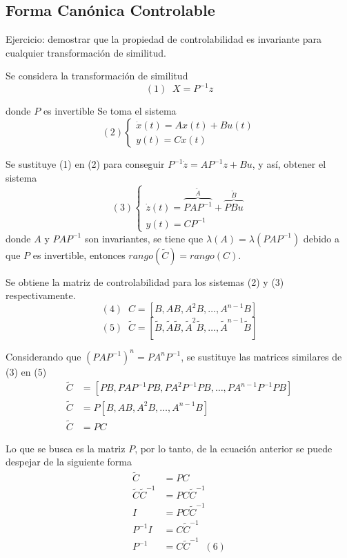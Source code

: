 \subsection{Forma Canónica Controlable}

Ejercicio: demostrar que la propiedad de controlabilidad es invariante para cualquier transformación de similitud.

Se considera la transformación de similitud
\[
    (1) \;\; X = P^{-1}z
\]

donde \( P \) es invertible
Se toma el sistema 
\[(2)
    \left\{
        \begin{array}{lll}
            \dot{x}(t) = Ax(t) + Bu(t) \\
            y(t) = Cx(t)
        \end{array}
    \right.
\]

Se sustituye (1) en (2) para conseguir \( P^{-1}\dot{z} = AP^{-1}z+Bu \), y así, obtener el sistema
\[(3)
    \left\{
        \begin{array}{lll}
            \dot{z}(t) = \overbrace{ PAP^{-1}}^{\tilde{A} } + \overbrace{ PBu}^{\tilde{B} } \\
            y(t) = CP^{-1}
        \end{array}
    \right.
\]
donde \( A \) y \( PAP^{-1} \) son invariantes, se tiene que \( \lambda (A) = \lambda(PAP^{-1}) \) debido a que \( P \) es invertible, entonces \( rango( \tilde{C} ) = rango(C) \).

Se obtiene la matriz de controlabilidad para los sistemas (2) y (3) respectivamente.
\[(4) \;\;
    C=[B , AB , A^{2}B , \ldots , A^{n-1}B]
\]
\[(5) \;\;
    \tilde{C} = [\tilde{B} , \tilde{A}\tilde{B} , \tilde{A}^{2}\tilde{B} , \ldots , \tilde{A}^{n-1}\tilde{B}]
\]

Considerando que \( (PAP^{-1})^{n} = PA^{n}P^{-1} \), se sustituye las matrices similares de (3) en (5)
\[
    \begin{split}
        \tilde{C} & = [PB, PAP^{-1}PB, PA^{2}P^{-1}PB, \ldots, PA^{n-1}P^{-1}PB] \\
        \tilde{C} & = P[B, AB, A^{2}B, \ldots, A^{n-1}B] \\
        \tilde{C} & = PC 
    \end{split}
\]

Lo que se busca es la matriz \( P \), por lo tanto, de la ecuación anterior se puede despejar de la siguiente forma
\[
    \begin{split}
        \tilde{C} & = PC \\
        \tilde{C}\tilde{C}^{-1} & = PC\tilde{C}^{-1} \\
        I & = PC\tilde{C}^{-1} \\
        P^{-1}I & = C\tilde{C}^{-1} \\
        P^{-1} & = C\tilde{C}^{-1} \;\; (6)
    \end{split}
\]

